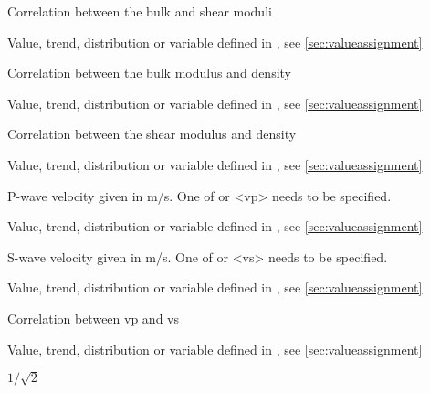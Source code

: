 {
 \slist
   \item \Description Correlation between the bulk and shear moduli
   \item \Argument Value, trend, distribution or variable defined in , see \autoref{sec:valueassignment}
   \item {}
 \elist

 \slist
   \item \Description Correlation between the bulk modulus and density
   \item \Argument Value, trend, distribution or variable defined in , see \autoref{sec:valueassignment}
   \item {}
 \elist

 \slist
   \item \Description Correlation between the shear modulus and density
   \item \Argument Value, trend, distribution or variable defined in , see \autoref{sec:valueassignment}
   \item {}
 \elist

 \slist
   \item \Description P-wave velocity given in m/s. One of  or <vp> needs to be specified.
   \item \Argument Value, trend, distribution or variable defined in , see \autoref{sec:valueassignment}
   \item \Default 
 \elist

 \slist
   \item \Description S-wave velocity given in m/s. One of  or <vs> needs to be specified.
   \item \Argument Value, trend, distribution or variable defined in , see \autoref{sec:valueassignment}
   \item \Default 
 \elist

 \slist
   \item \Description Correlation between vp and vs
   \item \Argument Value, trend, distribution or variable defined in , see \autoref{sec:valueassignment}
   \item \Default $1/\sqrt{2}$
 \elist

}
